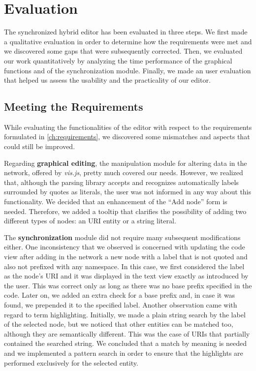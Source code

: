 \chapter{Evaluation}
\label{ch:evaluation}

The synchronized hybrid editor has been evaluated in three steps. We first made a qualitative evaluation in order to determine how the requirements were met and we discovered some gaps that were subsequently corrected. Then, we evaluated our work quantitatively by analyzing the time performance of the graphical functions and of the synchronization module. Finally, we made an user evaluation that helped us assess the usability and the practicality of our editor. 

\section {Meeting the Requirements}

While evaluating the functionalities of the editor with respect to the requirements formulated in \autoref{ch:requirements}, we discovered some mismatches and aspects that could still be improved.

Regarding \textbf{graphical editing}, the manipulation module for altering data in the network, offered by \textit{vis.js}, pretty much covered our needs. However, we realized that, although the parsing library accepts and recognizes automatically labels surrounded by quotes as literals, the user was not informed in any way about this functionality. We decided that an enhancement of the ``Add node'' form is needed. Therefore, we added a tooltip that clarifies the possibility of adding two different types of nodes: an URI entity or a string literal.

The \textbf{synchronization} module did not require many subsequent modifications either. One inconsistency that we observed is concerned with updating the code view after adding in the network a new node with a label that is not quoted and also not prefixed with any namespace. In this case, we first considered the label as the node's URI and it was displayed in the text view exactly as introduced by the user. This was correct only as long as there was no base prefix specified in the code. Later on, we added an extra check for a base prefix and, in case it was found, we prepended it to the specified label. Another observation came with regard to term highlighting. Initially, we made a plain string search by the label of the selected node, but we noticed that other entities can be matched too, although they are semantically different. This was the case of URIs that partially contained the searched string. We concluded that a match by meaning is needed and we implemented a pattern search in order to ensure that the highlights are performed exclusively for the selected entity.

